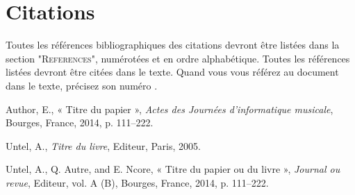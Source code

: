 \documentclass{article}
\begin{document}
\section{Citations}

Toutes les références bibliographiques des citations devront être listées dans la section "\textsc{References}", numérotées et en ordre alphabétique. Toutes les références  listées devront être citées dans le texte. Quand  vous vous référez au document dans le texte, précisez son numéro \cite{Author:00}.

\begin{thebibliography}{2}

 Author, E.,
« Titre du papier »,
{\it Actes des Journées d’informatique musicale}, 
Bourges, France, 2014, p. 111--222.

 Untel, A.,
{\it  Titre du livre},
Editeur, Paris, 2005.

 Untel, A., Q. Autre, and E. Ncore, 
« Titre du papier ou du livre »,
{\it Journal ou revue}, 
Editeur, vol. A (B), Bourges, France, 2014, p. 111--222.

\end{thebibliography}
\end{document}
